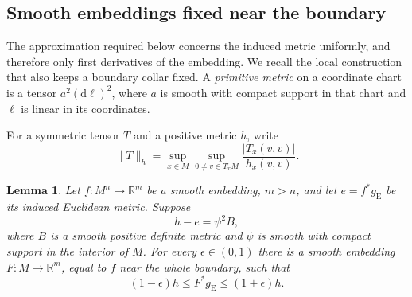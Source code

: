 \documentclass[11pt]{article}
\newtheorem{lemma}[lemma]{Lemma}
\theoremstyle{remark}
\newcommand{\R}{\mathbb R}
\begin{document}
\subsection{Smooth embeddings fixed near the boundary}

The approximation required below concerns the induced metric uniformly,
and therefore only first derivatives of the embedding. We recall the local
construction that also keeps a boundary collar fixed. A \emph{primitive
metric} on a coordinate chart is a tensor $a^2(\mathrm d\ell)^2$, where
$a$ is smooth with compact support in that chart and $\ell$ is linear in
its coordinates.

For a symmetric tensor $T$ and a positive metric $h$, write
\[
 \|T\|_h=
 \sup_{x\in M}\sup_{0\ne v\in T_xM}
             \frac{|T_x(v,v)|}{h_x(v,v)}.
\]

\begin{lemma}\label{lem:relative-approximation}
Let $f:M^n\to\R^m$ be a smooth embedding, $m>n$, and let
$e=f^*g_{\mathrm E}$ be its induced Euclidean metric. Suppose
\begin{equation}\label{eq:factored-defect}
 h-e=\psi^2B,
\end{equation}
where $B$ is a smooth positive definite metric and $\psi$ is smooth with
compact support in the interior of $M$. For every $\epsilon\in(0,1)$ there
is a smooth embedding $F:M\to\R^m$, equal to $f$ near the whole boundary,
such that
\begin{equation}\label{eq:near-isometry}
 (1-\epsilon)h\leq F^*g_{\mathrm E}\leq(1+\epsilon)h.
\end{equation}
\end{lemma}
\end{document}

